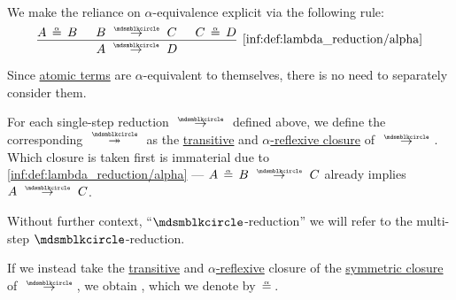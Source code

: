 \begin{definition}
\begin{thmenum}
    We make the reliance on \( \alpha \)-equivalence explicit via the following rule:
    \begin{equation*}\taglabel[\ensuremath{ \logic{Alpha}_{\Anon} }]{inf:def:lambda_reduction/alpha}
      \begin{prooftree}
        \hypo{ A \aequiv B }
        \hypo{ B \pred C }
        \hypo{ C \aequiv D }
        \infer3[\ref{inf:def:lambda_reduction/alpha}]{ A \pred D }.
      \end{prooftree}
    \end{equation*}

    Since \hyperref[def:simple_type_system/atom]{atomic terms} are \( \alpha \)-equivalent to themselves, there is no need to separately consider them.

     For each single-step reduction \( {\pred} \) defined above, we define the corresponding  \( {\pred*} \) as the \hyperref[def:relation_closures/transitive]{transitive} and \hyperref[def:alpha_reflexive]{\( \alpha \)-reflexive closure} of \( {\pred} \). Which closure is taken first is immaterial due to \ref{inf:def:lambda_reduction/alpha} --- \( A \aequiv B \pred C \) already implies \( A \pred C \).

    Without further context, \enquote{\( {\Anon} \)-reduction} we will refer to the multi-step \( {\Anon} \)-reduction.

     If we instead take the
    \hyperref[def:relation_closures/transitive]{transitive} and \hyperref[def:alpha_reflexive]{\( \alpha \)-reflexive} closure of the \hyperref[def:relation_closures/symmetric]{symmetric closure} of \( \pred \), we obtain , which we denote by \( {\requiv} \).
  \end{thmenum}
\end{definition}

